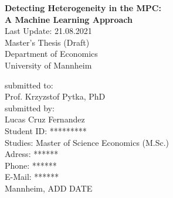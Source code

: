 \begin{titlepage}

\begin{center}

\vspace*{1,2cm}

\huge {\bfseries Detecting Heterogeneity in the MPC: \\ A Machine Learning Approach}\\[1.8cm]
\Large {Last Update: 21.08.2021}\\[1cm]

\Large {Master's Thesis (Draft)}\\[1cm]
\large {Department of Economics}\\[0.2cm]

\large {University of Mannheim}\\[0.5cm]

\end{center}

\vfill

\noindent submitted to:\\
Prof. Krzyzstof Pytka, PhD\\[1cm]
submitted by:\\
Lucas Cruz Fernandez\\[1cm]
Student ID: *********\\
Studies: Master of Science Economics (M.Sc.)\\[1cm]
Adress: ****** \\
Phone: ****** \\
E-Mail: ****** \\[1cm]
Mannheim, ADD DATE

\setcounter{page}{0}

\end{titlepage}
